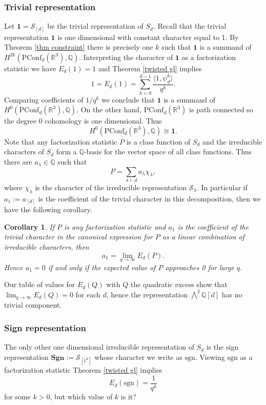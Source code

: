 \documentclass[submission]{FPSAC2018}
\newtheorem{cor}[thm]{Corollary}
\theoremstyle{definition}
\numberwithin{equation}{section}
\def\QQ{\mathbb{Q}}
\def\RR{\mathbb{R}}
\newcommand\PConf{\mathrm{PConf}}
\def\sgn{\mathrm{sgn}}
\newcommand{\Sp}{\mathcal{S}}
\newcommand{\tr}{\mathbf{1}}
\newcommand{\Sgn}{\mathbf{Sgn}}
\begin{document}
\subsubsection{Trivial representation} Let $\tr = \Sp_{[d]}$ be the trivial representation of $S_d$. Recall that the trivial representation $\tr$ is one dimensional with constant character equal to 1. By Theorem \ref{thm constraint} there is precisely one $k$ such that $\tr$ is a summand of $H^{2k}(\PConf_d(\RR^3),\QQ)$. Interpreting the character of $\tr$ as a factorization statistic we have $E_d(1) = 1$ and Theorem \ref{twisted gl} implies
\[
    1 = E_d(1) = \sum_{k=0}^{d-1}\frac{\langle 1, \psi_d^k\rangle}{q^k}.
\]
Comparing coefficients of $1/q^k$ we conclude that $\tr$ is a summand of $H^0(\PConf_d(\RR^3),\QQ)$. On the other hand, $\PConf_d(\RR^3)$ is path connected so the degree 0 cohomology is one dimensional. Thus
\[
    H^0(\PConf_d(\RR^3),\QQ) \cong \tr.
\]
Note that any factorization statistic $P$ is a class function of $S_d$ and the irreducible characters of $S_d$ form a $\QQ$-basis for the vector space of all class functions. Thus there are $a_\lambda\in \QQ$ such that
\[
    P = \sum_{\lambda\vdash d} a_\lambda \chi_\lambda,
\]
where $\chi_\lambda$ is the character of the irreducible representation $\Sp_\lambda$. In particular if $a_1 := a_{[d]}$ is the coefficient of the trivial character in this decomposition, then we have the following corollary.

\begin{cor}
If $P$ is any factorization statistic and $a_1$ is the coefficient of the trivial character in the canonical expression for $P$ as a linear combination of irreducible characters, then
\[
    a_1 = \lim_{q\rightarrow\infty} E_d(P).
\]
Hence $a_1 = 0$ if and only if the expected value of $P$ approaches 0 for large $q$.
\end{cor}

Our table of values for $E_d(Q)$ with $Q$ the quadratic excess show that $\lim_{q\rightarrow\infty}E_d(Q) = 0$ for each $d$, hence the representation $\bigwedge^2\QQ[d]$ has no trivial component.

\subsubsection{Sign representation} The only other one dimensional irreducible representation of $S_d$ is the sign representation $\Sgn := \Sp_{[1^d]}$ whose character we write as $\sgn$. Viewing $\sgn$ as a factorization statistic Theorem \ref{twisted gl} implies
\[
    E_d(\sgn) = \frac{1}{q^k}
\]
for some $k>0$, but which value of $k$ is it?
\end{document}
